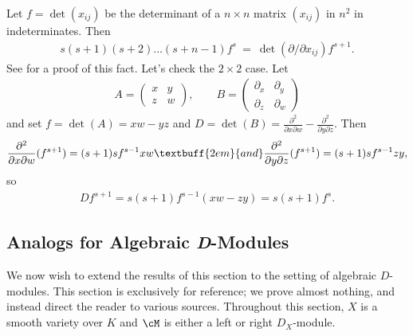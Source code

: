 \begin{example}\label{example:b-function-cayley}
	Let $f = \det(x_{ij})$ be the determinant of a $n\times n$ matrix $(x_{ij})$ in $n^2$ in indeterminates. Then
	\begin{align*}
		s(s+1)(s+2)...(s+n-1)f^s ~=~ \det(\partial/\partial x_{ij}) f^{s+1}.
	\end{align*}
	See \cite{cayley-identity} for a proof of this fact. Let's check the $2\times 2$ case. Let
	\begin{align*}
		A = 
		\begin{pmatrix}
			x & y \\
			z & w
		\end{pmatrix}, \hspace{2em}
		B =
		\begin{pmatrix}
			\partial_x & \partial_y \\
			\partial_z & \partial_w
		\end{pmatrix}
	\end{align*}
	and set $f = \det(A) = xw - yz$ and $D = \det(B) = \frac{\partial^2}{\partial x\partial w} - \frac{\partial^2}{\partial y\partial z}$. Then
	\begin{align*}
		\frac{\partial^2}{\partial x\partial w}(f^{s+1}) = (s+1)sf^{s-1}xw \textbuff{2em}{and} \frac{\partial^2}{\partial y\partial z}(f^{s+1}) = (s+1)sf^{s-1}zy,
	\end{align*}
	so
	\begin{align*}
		Df^{s+1} = s(s+1)f^{s-1}(xw - zy) = s(s+1)f^s.
	\end{align*}
\end{example}

\subsection{Analogs for Algebraic \textit{D}-Modules}\label{sec:d-mod-smooth-varieties}

We now wish to extend the results of this section to the setting of algebraic $D$-modules. This section is exclusively for reference; we prove almost nothing, and instead direct the reader to various sources. Throughout this section, $X$ is a smooth variety over $K$ and $\cM$ is either a left or right $D_X$-module.

